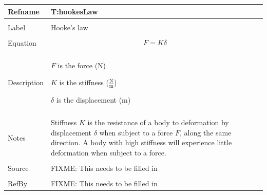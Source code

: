 \documentclass[12pt]{article}
\begin{document}
\noindent \begin{minipage}{\textwidth}
\begin{tabular}{p{} p{}}
\toprule \textbf{Refname} & \textbf{T:hookesLaw}
\label{T:hookesLaw}
\\ \midrule \\
Label & Hooke's law
\\ \midrule \\
Equation & \begin{dmath}
           F=K δ
           \end{dmath}
\\ \midrule \\
Description & \begin{symbDescription}
              \item{$F$ is the force (N)}
              \item{$K$ is the stiffness ($\frac{\text{N}}{\text{m}}$)}
              \item{$δ$ is the displacement (m)}
              \end{symbDescription}
\\ \midrule \\
 Notes & Stiffness $K$ is the resistance of a body to deformation by displacement $δ$ when subject to a force $F$, along the same direction. A body with high stiffness will experience little deformation when subject to a force.
\\ \midrule \\
Source & FIXME: This needs to be filled in
\\ \midrule \\
RefBy & FIXME: This needs to be filled in
\\ \bottomrule \end{tabular}
\end{minipage}\\
\end{document}
